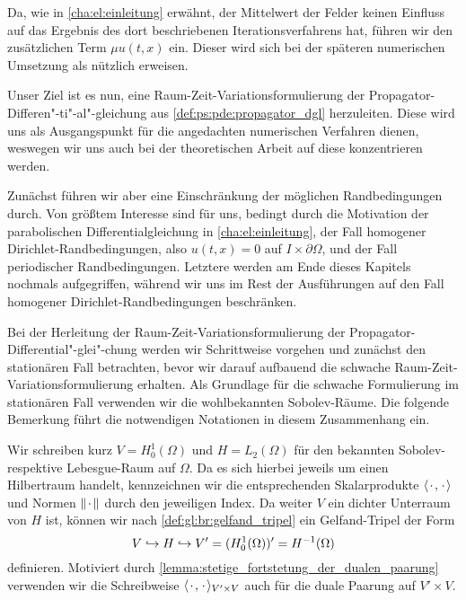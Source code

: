 Da, wie in \cref{cha:el:einleitung} erwähnt, der Mittelwert der Felder keinen Einfluss auf das Ergebnis des dort beschriebenen Iterationsverfahrens hat, führen wir den zusätzlichen Term $\mu u(t, x)$ ein.
Dieser wird sich bei der späteren numerischen Umsetzung als nützlich erweisen.


Unser Ziel ist es nun, eine Raum-Zeit-Variationsformulierung der Propagator-Differen"-ti"-al"-gleichung
aus \cref{def:ps:pde:propagator_dgl} herzuleiten.
Diese wird uns als Ausgangspunkt für die angedachten numerischen Verfahren dienen, weswegen wir uns auch bei der theoretischen Arbeit auf diese konzentrieren werden.

Zunächst führen wir aber eine Einschränkung der möglichen Randbedingungen durch.
Von größtem Interesse sind für uns, bedingt durch die Motivation der parabolischen Differentialgleichung in \cref{cha:el:einleitung}, der Fall homogener Dirichlet-Randbedingungen, also $u(t, x) = 0$ auf $I \times \partial \Omega$, und der Fall periodischer Randbedingungen.
Letztere werden am Ende dieses Kapitels nochmals aufgegriffen, während wir uns im Rest der Ausführungen auf den Fall homogener Dirichlet-Randbedingungen beschränken.

Bei der Herleitung der Raum-Zeit-Variationsformulierung der Propagator-Differential"-glei"-chung werden wir Schrittweise vorgehen und zunächst den stationären Fall betrachten, bevor wir darauf aufbauend die schwache Raum-Zeit-Variationsformulierung erhalten.
Als Grundlage für die schwache Formulierung im stationären Fall verwenden wir die wohlbekannten Sobolev-Räume.
Die folgende Bemerkung führt die notwendigen Notationen in diesem Zusammenhang ein.

\begin{Bemerkung}
\label{bemerkung:prop:gelfand}
    Wir schreiben kurz $V = H^{1}_{0}(\Omega)$ und $H = L_{2}(\Omega)$ für den bekannten Sobolev- respektive Lebesgue-Raum auf $\Omega$.
    Da es sich hierbei jeweils um einen Hilbertraum handelt, kennzeichnen wir die entsprechenden Skalarprodukte $\langle{\mkern2mu\cdot\mkern2mu},{\mkern2mu\cdot\mkern2mu}\rangle_{}$ und Normen $\lVert{\mkern2mu\cdot\mkern2mu}\rVert$ durch den jeweiligen Index.
    Da weiter $V$ ein dichter Unterraum von $H$ ist, können wir nach \cref{def:gl:br:gelfand_tripel} ein Gelfand-Tripel der Form
    \begin{equation}
        V \hookrightarrow H \hookrightarrow V' = (H^{1}_{0}(\Omega))' = H^{-1}(\Omega)
    \end{equation}
    definieren.
    Motiviert durch \cref{lemma:stetige_fortstetung_der_dualen_paarung} verwenden wir die Schreibweise $\langle{\mkern2mu\cdot\mkern2mu},{\mkern2mu\cdot\mkern2mu}\rangle_{V' \times V}$ auch für die duale Paarung auf $V' \times V$.
\end{Bemerkung}

